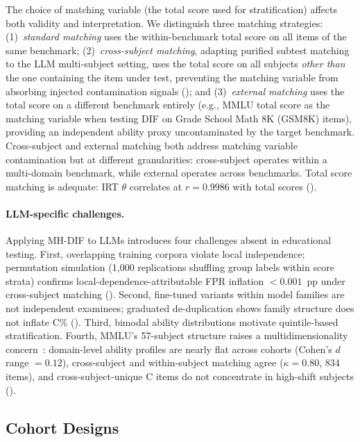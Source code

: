 The choice of matching variable (the total score used for stratification) affects both validity and interpretation. We distinguish three matching strategies: (1)~\emph{standard matching} uses the within-benchmark total score on all items of the same benchmark; (2)~\emph{cross-subject matching}, adapting purified subtest matching~\citep{swaminathan1990logistic} to the LLM multi-subject setting, uses the total score on all subjects \emph{other than} the one containing the item under test, preventing the matching variable from absorbing injected contamination signals (); and (3)~\emph{external matching} uses the total score on a different benchmark entirely (e.g., MMLU total score as the matching variable when testing DIF on Grade School Math 8K (GSM8K) items), providing an independent ability proxy uncontaminated by the target benchmark. Cross-subject and external matching both address matching variable contamination but at different granularities: cross-subject operates within a multi-domain benchmark, while external operates across benchmarks. Total score matching is adequate: IRT $\theta$ correlates at $r = 0.9986$ with total scores ().

\paragraph{LLM-specific challenges.} Applying MH-DIF to LLMs introduces four challenges absent in educational testing. First, overlapping training corpora violate local independence; permutation simulation (1{,}000 replications shuffling group labels within score strata) confirms local-dependence-attributable FPR inflation $< 0.001$~pp under cross-subject matching (). Second, fine-tuned variants within model families are not independent examinees; graduated de-duplication shows family structure does not inflate C\% (). Third, bimodal ability distributions motivate quintile-based stratification. Fourth, MMLU's 57-subject structure raises a multidimensionality concern~\citep{ackerman1992didmf,roussos1996multidimensionality}: domain-level ability profiles are nearly flat across cohorts (Cohen's $d$ range $= 0.12$), cross-subject and within-subject matching agree ($\kappa = 0.80$, 834 items), and cross-subject-unique C items do not concentrate in high-shift subjects ().

\subsection{Cohort Designs}
\label{sec:cohorts}

